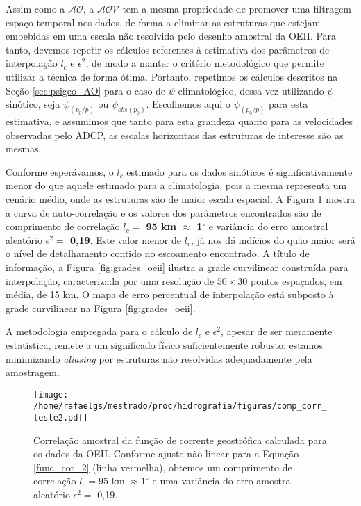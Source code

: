 Assim como a $\mathcal{AO}$, a $\mathcal{AOV}$ tem a mesma propriedade de promover uma filtragem espaço-temporal
nos dados, de forma a eliminar as estruturas que estejam embebidas em uma escala não resolvida pelo desenho
amostral da OEII. Para tanto, devemos repetir os cálculos referentes à estimativa dos parâmetros de interpolação
{\bf $l_c$} e {\bf $\epsilon^2$}, de modo a manter o critério metodológico que permite utilizar a técnica de forma
ótima. Portanto, repetimos os cálculos descritos na Seção \ref{sec:psigeo_AO} para o caso de $\psi$ climatológico,
dessa vez utilizando $\psi$ sinótico, seja $\psi_{(p_0/p)}$ ou $\psi_{obs(p_0)}$. 
Escolhemos aqui o $\psi_{(p_0/p)}$ para esta estimativa, e assumimos que 
tanto para esta grandeza quanto para as velocidades observadas pelo ADCP, as escalas horizontais das estruturas
de interesse são as mesmas. 

Conforme esperávamos, o  {\bf $l_c$} estimado para os dados sinóticos é significativamente menor do que aquele
estimado para a climatologia, pois a mesma representa um cenário médio, onde as estruturas são de maior escala 
espacial. A Figura \ref{fig:corr_oeii} mostra a curva de 
auto-correlação e os valores dos parâmetros encontrados são de comprimento de 
correlação \textbf{$l_c =$ 95 km $\approx$ 1$^\circ$} e variância do erro amostral 
aleatório \textbf{$\epsilon^2 =$ 0,19}. Este valor menor de $l_c$, já nos dá indícios do quão maior será o nível 
de detalhamento contido no escoamento encontrado. A título de informação, a Figura \ref{fig:grades_oeii}
ilustra a grade curvilinear construída para 
interpolação, caracterizada por uma resolução de $50 \times 30$ pontos espaçados, em média, 
de 15 km. O mapa de erro percentual de interpolação está subposto à grade curvilinear na Figura \ref{fig:grades_oeii}.

A metodologia empregada para o cálculo de $l_c$ e $\epsilon^2$, apesar de ser meramente estatística, 
remete a um significado físico suficientemente robusto: estamos minimizando {\it aliasing} por estruturas
não resolvidas adequadamente pela amostragem. 


\begin{figure}%
 \begin{center}
  \texttt{[image: /home/rafaelgs/mestrado/proc/hidrografia/figuras/comp\_corr\_leste2.pdf]}
 \end{center}
 \vspace{-.25cm}
 \renewcommand{\baselinestretch}{1}
 \caption{\label{fig:corr_oeii} \small Correlação amostral da função de corrente 
 geostrófica calculada para os dados da OEII. Conforme ajuste não-linear para a Equação 
 \ref{func_cor_2} (linha vermelha), obtemos um comprimento de correlação $l_c = 95$ km 
 $\approx 1^\circ$ e uma variância do erro amostral aleatório $\epsilon^2 =$ 0,19.}
\end{figure}

